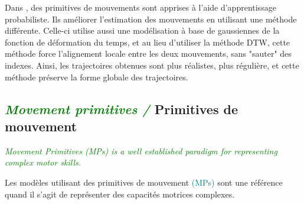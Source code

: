 \documentclass[utf8]{frontiersSCNS} %
\newcommand{\toimprove}[1]{\textcolor{teal}{#1}}
\newcommand{\todo}[1]{\textcolor{red}{\textbf{/*#1*/}}}
\newcommand{\quest}[1]{\textcolor{green}{\textit{#1}}}
\begin{document}
Dans \cite{maeda2014learning}, des primitives de mouvements sont apprises à l'aide d'apprentissage probabiliste. Ils améliorer l'estimation des mouvements en utilisant une méthode différente. Celle-ci utilise aussi une modélisation à base de gaussiennes de la fonction de déformation du temps, et au lieu d'utiliser la méthode DTW, cette méthode force l'alignement locale entre les deux mouvements, sans "sauter" des indexes. Ainsi, les trajectoires obtenues sont plus réalistes, plus régulière, et cette méthode préserve la forme globale des trajectoires.

\subsection{\quest{Movement primitives /} Primitives de mouvement}




\quest{Movement Primitives (MPs) is a well established paradigm for representing complex motor skills.}

Les modèles utilisant des primitives de mouvement \toimprove{(MPs)} sont une référence quand il s'agit de représenter des capacités motrices complexes.
\end{document}
